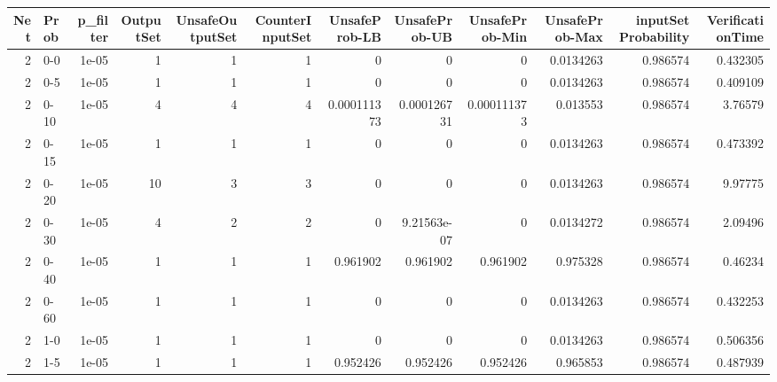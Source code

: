 \begin{tabular}{rlrrrrrrrrrr}
\hline
   Net & Prob   &   p\_filter &   OutputSet &   UnsafeOutputSet &   CounterInputSet &   UnsafeProb-LB &   UnsafeProb-UB &   UnsafeProb-Min &   UnsafeProb-Max &   inputSet Probability &   VerificationTime \\
\hline
     2 & 0-0    &      1e-05 &           1 &                 1 &                 1 &     0           &     0           &      0           &        0.0134263 &               0.986574 &           0.432305 \\
     2 & 0-5    &      1e-05 &           1 &                 1 &                 1 &     0           &     0           &      0           &        0.0134263 &               0.986574 &           0.409109 \\
     2 & 0-10   &      1e-05 &           4 &                 4 &                 4 &     0.000111373 &     0.000126731 &      0.000111373 &        0.013553  &               0.986574 &           3.76579  \\
     2 & 0-15   &      1e-05 &           1 &                 1 &                 1 &     0           &     0           &      0           &        0.0134263 &               0.986574 &           0.473392 \\
     2 & 0-20   &      1e-05 &          10 &                 3 &                 3 &     0           &     0           &      0           &        0.0134263 &               0.986574 &           9.97775  \\
     2 & 0-30   &      1e-05 &           4 &                 2 &                 2 &     0           &     9.21563e-07 &      0           &        0.0134272 &               0.986574 &           2.09496  \\
     2 & 0-40   &      1e-05 &           1 &                 1 &                 1 &     0.961902    &     0.961902    &      0.961902    &        0.975328  &               0.986574 &           0.46234  \\
     2 & 0-60   &      1e-05 &           1 &                 1 &                 1 &     0           &     0           &      0           &        0.0134263 &               0.986574 &           0.432253 \\
     2 & 1-0    &      1e-05 &           1 &                 1 &                 1 &     0           &     0           &      0           &        0.0134263 &               0.986574 &           0.506356 \\
     2 & 1-5    &      1e-05 &           1 &                 1 &                 1 &     0.952426    &     0.952426    &      0.952426    &        0.965853  &               0.986574 &           0.487939 \\

\end{tabular}
